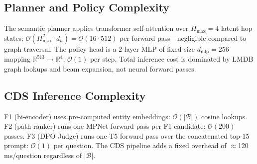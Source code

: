 \documentclass[10pt,conference]{IEEEtran}
\begin{document}
\subsection{Planner and Policy Complexity}

The semantic planner applies transformer self-attention over $H_{\max}=4$ latent hop states: $\mathcal{O}(H_{\max}^2 \cdot d_h) = \mathcal{O}(16 \cdot 512)$ per forward pass—negligible compared to graph traversal. The policy head is a 2-layer MLP of fixed size $d_{\text{mlp}}=256$ mapping $\mathbb{R}^{513} \to \mathbb{R}^4$: $\mathcal{O}(1)$ per step. Total inference cost is dominated by LMDB graph lookups and beam expansion, not neural forward passes.

\subsection{CDS Inference Complexity}

F1 (bi-encoder) uses pre-computed entity embeddings: $\mathcal{O}(|\mathcal{B}|)$ cosine lookups. F2 (path ranker) runs one MPNet forward pass per F1 candidate: $\mathcal{O}(200)$ passes. F3 (DPO Judge) runs one T5 forward pass over the concatenated top-15 prompt: $\mathcal{O}(1)$ per question. The CDS pipeline adds a fixed overhead of $\approx$120\,ms/question regardless of $|\mathcal{B}|$.
\end{document}

